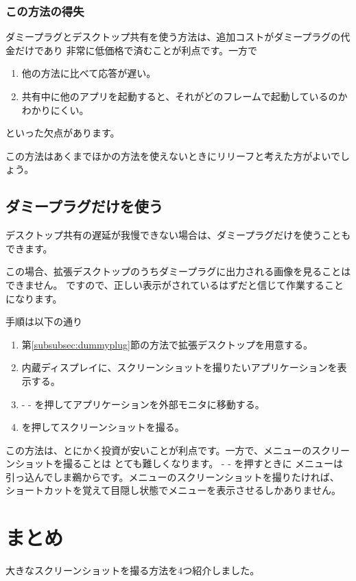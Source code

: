 \subsubsection{この方法の得失}
ダミープラグとデスクトップ共有を使う方法は、追加コストがダミープラグの代金だけであり
非常に低価格で済むことが利点です。一方で

\begin{enumerate}
  \item 他の方法に比べて応答が遅い。
  \item 共有中に他のアプリを起動すると、それがどのフレームで起動しているのかわかりにくい。
\end{enumerate}

といった欠点があります。

この方法はあくまでほかの方法を使えないときにリリーフと考えた方がよいでしょう。

\subsection{ダミープラグだけを使う}
デスクトップ共有の遅延が我慢できない場合は、ダミープラグだけを使うこともできます。

この場合、拡張デスクトップのうちダミープラグに出力される画像を見ることはできません。
ですので、正しい表示がされているはずだと信じて作業することになります。

手順は以下の通り

\begin{enumerate}
  \item 第\ref{subsubsec:dummyplug}節の方法で拡張デスクトップを用意する。
  \item 内蔵ディスプレイに、スクリーンショットを撮りたいアプリケーションを表示する。
  \item {} -  - を押してアプリケーションを外部モニタに移動する。
  \item {}を押してスクリーンショットを撮る。
\end{enumerate}

この方法は、とにかく投資が安いことが利点です。一方で、メニューのスクリーンショットを撮ることは
とても難しくなります。 -  - を押すときに
メニューは引っ込んでしま鵜からです。メニューのスクリーンショットを撮りたければ、
ショートカットを覚えて目隠し状態でメニューを表示させるしかありません。

\section{まとめ}
大きなスクリーンショットを撮る方法を4つ紹介しました。

